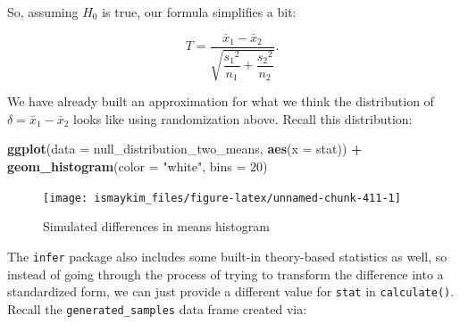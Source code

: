 \documentclass[12pt,]{krantz}
\makeatletter
\newenvironment{Shaded}{\begin{snugshade}}{\end{snugshade}}
\newcommand{\KeywordTok}[1]{\textcolor[rgb]{0.27,0.27,0.27}{\textbf{#1}}}
\newcommand{\DataTypeTok}[1]{\textcolor[rgb]{0.27,0.27,0.27}{#1}}
\newcommand{\DecValTok}[1]{\textcolor[rgb]{0.06,0.06,0.06}{#1}}
\newcommand{\StringTok}[1]{\textcolor[rgb]{0.5,0.5,0.5}{#1}}
\newcommand{\OperatorTok}[1]{\textcolor[rgb]{0.43,0.43,0.43}{\textbf{#1}}}
\newcommand{\NormalTok}[1]{#1}
\newenvironment{kframe}{%
\medskip{}
\setlength{\fboxsep}{.8em}
 \def\at@end@of@kframe{}%
 \ifinner\ifhmode%
  \def\at@end@of@kframe{\end{minipage}}%
  \begin{minipage}{\columnwidth}%
 \fi\fi%
 \def\FrameCommand##1{\hskip\@totalleftmargin \hskip-\fboxsep
 \colorbox{shadecolor}{##1}\hskip-\fboxsep
     \hskip-\linewidth \hskip-\@totalleftmargin \hskip\columnwidth}%
 \MakeFramed {\advance\hsize-\width
   \@totalleftmargin\z@ \linewidth\hsize
   \@setminipage}}%
 {\par\unskip\endMakeFramed%
 \at@end@of@kframe}
\renewenvironment{Shaded}{\begin{kframe}}{\end{kframe}}
\theoremstyle{definition}
\theoremstyle{definition}
\theoremstyle{definition}
\theoremstyle{remark}
\makeatother
\begin{document}
So, assuming \(H_0\) is true, our formula simplifies a bit:

\[T =\dfrac{ \bar{x}_1 - \bar{x}_2}{ \sqrt{\dfrac{{s_1}^2}{n_1} + \dfrac{{s_2}^2}{n_2}}  }.\]

We have already built an approximation for what we think the
distribution of \(\delta = \bar{x}_1 - \bar{x}_2\) looks like using
randomization above. Recall this distribution:

\begin{Shaded}
\begin{Highlighting}[]
\KeywordTok{ggplot}\NormalTok{(}\DataTypeTok{data =}\NormalTok{ null_distribution_two_means, }\KeywordTok{aes}\NormalTok{(}\DataTypeTok{x =}\NormalTok{ stat)) }\OperatorTok{+}
\StringTok{  }\KeywordTok{geom_histogram}\NormalTok{(}\DataTypeTok{color =} \StringTok{"white"}\NormalTok{, }\DataTypeTok{bins =} \DecValTok{20}\NormalTok{)}
\end{Highlighting}
\end{Shaded}

\begin{figure}

{\centering \texttt{[image: ismaykim\_files/figure-latex/unnamed-chunk-411-1]} 

}

\caption{Simulated differences in means histogram}\label{fig:unnamed-chunk-411}
\end{figure}

The \texttt{infer} package also includes some built-in theory-based
statistics as well, so instead of going through the process of trying to
transform the difference into a standardized form, we can just provide a
different value for \texttt{stat} in \texttt{calculate()}. Recall the
\texttt{generated\_samples} data frame created via:

\begin{Shaded}
\end{Shaded}
\end{document}
